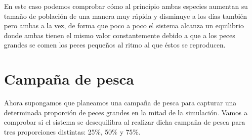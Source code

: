 \documentclass[11pt,a4paper]{report}
\begin{document}
En este caso podemos comprobar cómo al principio ambas especies aumentan su tamaño de población de una manera muy rápida y disminuye a los días también pero ambas a la vez, de forma que poco a poco el sistema alcanza un equilibrio donde ambas tienen el mismo valor constantemente debido a que a los peces grandes se comen los peces pequeños al ritmo al que éstos se reproducen.

\section{Campaña de pesca}
Ahora supongamos que planeamos una campaña de pesca para capturar una determinada proporción de peces grandes en la mitad de la simulación. Vamos a comprobar si el sistema se desequilibra al realizar dicha campaña de pesca para tres proporciones distintas: 25\%, 50\% y 75\%.
\end{document}
